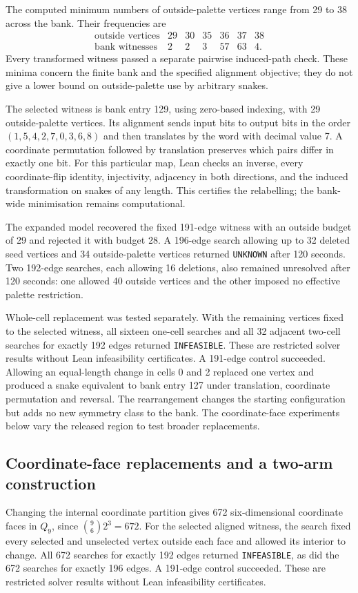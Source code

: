 \documentclass[11pt,a4paper]{article}
\theoremstyle{definition}
\theoremstyle{remark}
\begin{document}
The computed minimum numbers of outside-palette vertices range from 29 to 38 across the bank. Their frequencies are
\[
\begin{array}{c|rrrrrr}
\text{outside vertices}&29&30&35&36&37&38\\\hline
\text{bank witnesses}&2&2&3&57&63&4.
\end{array}
\]
Every transformed witness passed a separate pairwise induced-path check. These minima concern the finite bank and the specified alignment objective; they do not give a lower bound on outside-palette use by arbitrary snakes.

The selected witness is bank entry 129, using zero-based indexing, with 29 outside-palette vertices. Its alignment sends input bits to output bits in the order $(1,5,4,2,7,0,3,6,8)$ and then translates by the word with decimal value 7. A coordinate permutation followed by translation preserves which pairs differ in exactly one bit. For this particular map, Lean checks an inverse, every coordinate-flip identity, injectivity, adjacency in both directions, and the induced transformation on snakes of any length. This certifies the relabelling; the bank-wide minimisation remains computational.

The expanded model recovered the fixed 191-edge witness with an outside budget of 29 and rejected it with budget 28. A 196-edge search allowing up to 32 deleted seed vertices and 34 outside-palette vertices returned \texttt{UNKNOWN} after 120 seconds. Two 192-edge searches, each allowing 16 deletions, also remained unresolved after 120 seconds: one allowed 40 outside vertices and the other imposed no effective palette restriction.

Whole-cell replacement was tested separately. With the remaining vertices fixed to the selected witness, all sixteen one-cell searches and all 32 adjacent two-cell searches for exactly 192 edges returned \texttt{INFEASIBLE}. These are restricted solver results without Lean infeasibility certificates. A 191-edge control succeeded. Allowing an equal-length change in cells 0 and 2 replaced one vertex and produced a snake equivalent to bank entry 127 under translation, coordinate permutation and reversal. The rearrangement changes the starting configuration but adds no new symmetry class to the bank. The coordinate-face experiments below vary the released region to test broader replacements.

\subsection{Coordinate-face replacements and a two-arm construction}
Changing the internal coordinate partition gives 672 six-dimensional coordinate faces in $Q_9$, since $\binom96 2^3=672$. For the selected aligned witness, the search fixed every selected and unselected vertex outside each face and allowed its interior to change. All 672 searches for exactly 192 edges returned \texttt{INFEASIBLE}, as did the 672 searches for exactly 196 edges. A 191-edge control succeeded. These are restricted solver results without Lean infeasibility certificates.
\end{document}
